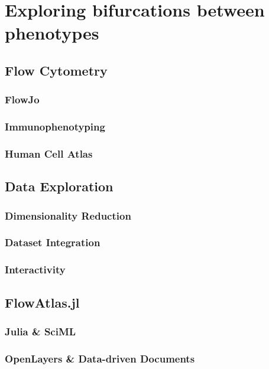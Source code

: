 \chapter{Exploring bifurcations between phenotypes}
\label{chapter:exploring}

\section{Flow Cytometry}

\subsection{FlowJo}
\subsection{Immunophenotyping}
\subsection{Human Cell Atlas}

\section{Data Exploration}

\subsection{Dimensionality Reduction}
\subsection{Dataset Integration}
\subsection{Interactivity}

\section{FlowAtlas.jl}

\subsection{Julia \& SciML}
\subsection{OpenLayers \& Data-driven Documents}